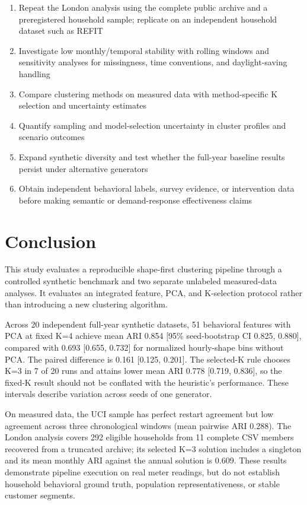 \documentclass[11pt,a4paper]{article}
\begin{document}
\begin{enumerate}
    \item Repeat the London analysis using the complete public archive and a preregistered household sample; replicate on an independent household dataset such as REFIT
    \item Investigate low monthly/temporal stability with rolling windows and sensitivity analyses for missingness, time conventions, and daylight-saving handling
    \item Compare clustering methods on measured data with method-specific K selection and uncertainty estimates
    \item Quantify sampling and model-selection uncertainty in cluster profiles and scenario outcomes
    \item Expand synthetic diversity and test whether the full-year baseline results persist under alternative generators
    \item Obtain independent behavioral labels, survey evidence, or intervention data before making semantic or demand-response effectiveness claims
\end{enumerate}

\section{Conclusion}
\label{sec:conclusion}

This study evaluates a reproducible shape-first clustering pipeline through a controlled synthetic benchmark and two separate unlabeled measured-data analyses. It evaluates an integrated feature, PCA, and K-selection protocol rather than introducing a new clustering algorithm.

Across 20 independent full-year synthetic datasets, 51 behavioral features with PCA at fixed K=4 achieve mean ARI 0.854 [95\% seed-bootstrap CI 0.825, 0.880], compared with 0.693 [0.655, 0.732] for normalized hourly-shape bins without PCA. The paired difference is 0.161 [0.125, 0.201]. The selected-K rule chooses K=3 in 7 of 20 runs and attains lower mean ARI 0.778 [0.719, 0.836], so the fixed-K result should not be conflated with the heuristic's performance. These intervals describe variation across seeds of one generator.

On measured data, the UCI sample has perfect restart agreement but low agreement across three chronological windows (mean pairwise ARI 0.288). The London analysis covers 292 eligible households from 11 complete CSV members recovered from a truncated archive; its selected K=3 solution includes a singleton and its mean monthly ARI against the annual solution is 0.609. These results demonstrate pipeline execution on real meter readings, but do not establish household behavioral ground truth, population representativeness, or stable customer segments.
\end{document}
